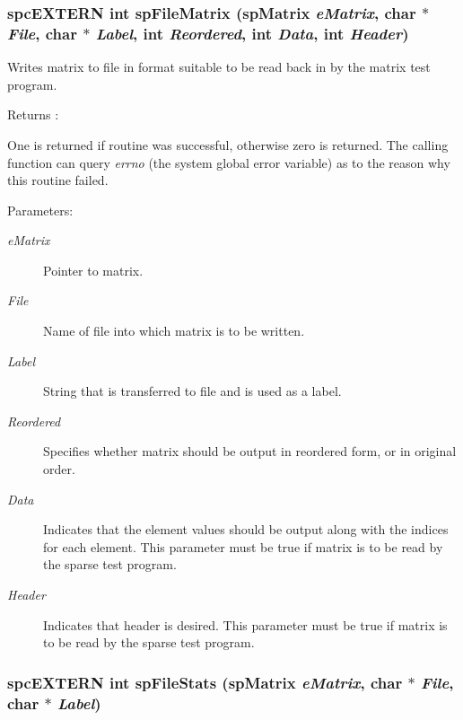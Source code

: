 \subsubsection{\setlength{\rightskip}{0pt plus 5cm}spc\-EXTERN int sp\-File\-Matrix ({\bf sp\-Matrix} {\em e\-Matrix}, char $\ast$ {\em File}, char $\ast$ {\em Label}, int {\em Reordered}, int {\em Data}, int {\em Header})}\label{spMatrix_8h_a31}


Writes matrix to file in format suitable to be read back in by the matrix test program.

\begin{Desc}
\item[Returns :]\par
 One is returned if routine was successful, otherwise zero is returned. The calling function can query {\em errno} (the system global error variable) as to the reason why this routine failed.\end{Desc}
\begin{Desc}
\item[Parameters: ]\par
\begin{description}
\item[{\em 
e\-Matrix}]Pointer to matrix. \item[{\em 
File}]Name of file into which matrix is to be written. \item[{\em 
Label}]String that is transferred to file and is used as a label. \item[{\em 
Reordered}]Specifies whether matrix should be output in reordered form, or in original order. \item[{\em 
Data}]Indicates that the element values should be output along with the indices for each element. This parameter must be true if matrix is to be read by the sparse test program. \item[{\em 
Header}]Indicates that header is desired. This parameter must be true if matrix is to be read by the sparse test program. \end{description}
\end{Desc}
\subsubsection{\setlength{\rightskip}{0pt plus 5cm}spc\-EXTERN int sp\-File\-Stats ({\bf sp\-Matrix} {\em e\-Matrix}, char $\ast$ {\em File}, char $\ast$ {\em Label})}\label{spMatrix_8h_a32}


